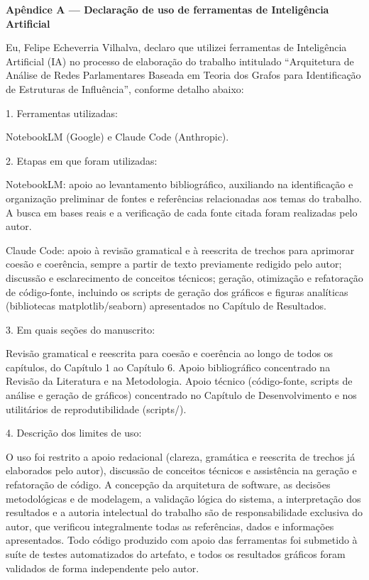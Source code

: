 \documentclass[12pt,a4paper]{article}
\begin{document}
{\LARGE\bfseries Apêndice A --- Declaração de uso de ferramentas de Inteligência Artificial}

\vspace{0.5cm}

Eu, Felipe Echeverria Vilhalva, declaro que utilizei ferramentas de
Inteligência Artificial (IA) no processo de elaboração do trabalho intitulado
``Arquitetura de Análise de Redes Parlamentares Baseada em Teoria dos
Grafos para Identificação de Estruturas de Influência'', conforme detalho
abaixo:

\vspace{0.3cm}
1. Ferramentas utilizadas:

NotebookLM (Google) e Claude Code (Anthropic).

\vspace{0.3cm}
2. Etapas em que foram utilizadas:

NotebookLM: apoio ao levantamento bibliográfico, auxiliando na identificação
e organização preliminar de fontes e referências relacionadas aos temas do
trabalho. A busca em bases reais e a verificação de cada fonte citada foram
realizadas pelo autor.

Claude Code: apoio à revisão gramatical e à reescrita de trechos para
aprimorar coesão e coerência, sempre a partir de texto previamente redigido
pelo autor; discussão e esclarecimento de conceitos técnicos; geração,
otimização e refatoração de código-fonte, incluindo os scripts de geração
dos gráficos e figuras analíticas (bibliotecas matplotlib/seaborn)
apresentados no Capítulo de Resultados.

\vspace{0.3cm}
3. Em quais seções do manuscrito:

Revisão gramatical e reescrita para coesão e coerência ao longo de todos os
capítulos, do Capítulo 1 ao Capítulo 6. Apoio bibliográfico concentrado na
Revisão da Literatura e na Metodologia. Apoio técnico (código-fonte, scripts
de análise e geração de gráficos) concentrado no Capítulo de Desenvolvimento
e nos utilitários de reprodutibilidade (scripts/).

\vspace{0.3cm}
4. Descrição dos limites de uso:

O uso foi restrito a apoio redacional (clareza, gramática e reescrita de
trechos já elaborados pelo autor), discussão de conceitos técnicos e
assistência na geração e refatoração de código. A concepção da arquitetura de
software, as decisões metodológicas e de modelagem, a validação lógica do
sistema, a interpretação dos resultados e a autoria intelectual do trabalho
são de responsabilidade exclusiva do autor, que verificou integralmente
todas as referências, dados e informações apresentados. Todo código
produzido com apoio das ferramentas foi submetido à suíte de testes
automatizados do artefato, e todos os resultados gráficos foram validados de
forma independente pelo autor.
\end{document}

